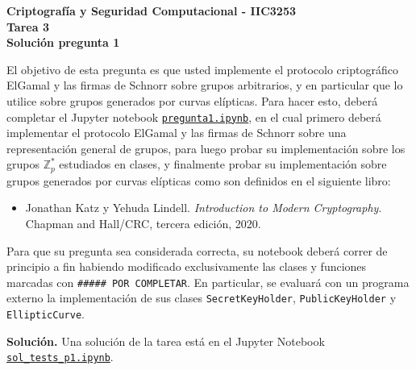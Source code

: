 \documentclass[11pt]{article}
\begin{document}
\begin{center}
  \bf Criptografía y Seguridad Computacional - IIC3253\\
  \bf Tarea 3\\
  \bf Solución pregunta 1
\end{center}

\bigskip

\noindent

\newcommand{\bbit}{\#\text{Bit}}
\newcommand{\dv}{\text{Div}}

El objetivo de esta pregunta es que usted implemente el protocolo
criptográfico ElGamal y las firmas de Schnorr sobre grupos
arbitrarios, y en particular que lo utilice sobre grupos generados por
curvas elípticas. Para hacer esto, deberá completar el Jupyter
notebook
\href{https://github.com/IIC3253/2023/blob/main/tareas/tarea\%203/enunciado/questions/p1/pregunta1.ipynb}{\texttt{pregunta1.ipynb}},
en el cual primero deberá implementar el protocolo ElGamal y las
firmas de Schnorr sobre una representación general de grupos, para
luego probar su implementación sobre los grupos $\mathbb{Z}_p^*$
estudiados en clases, y finalmente probar su implementación sobre grupos
generados por curvas elípticas como son definidos en el siguiente
libro:
\begin{itemize}
  \item Jonathan Katz y Yehuda Lindell. {\em Introduction to Modern Cryptography}. Chapman and Hall/CRC, tercera edición, 2020.
\end{itemize}
Para que su pregunta sea considerada correcta, su notebook deberá
correr de principio a fin habiendo modificado exclusivamente las
clases y funciones marcadas con \texttt{\#\#\#\#\# POR COMPLETAR}. En
particular, se evaluará con un programa externo la implementación de
sus clases \texttt{SecretKeyHolder}, \texttt{PublicKeyHolder} y
\texttt{EllipticCurve}.



\bigskip

\noindent
    {\bf Solución.}
    Una solución de la tarea está en el Jupyter Notebook
  \href{https://github.com/IIC3253/2023/blob/main/tareas/tarea\%203/soluciones/questions/p1/sol_tests_p1.ipynb}{\texttt{sol\_tests\_p1.ipynb}}.
  
\end{document}
